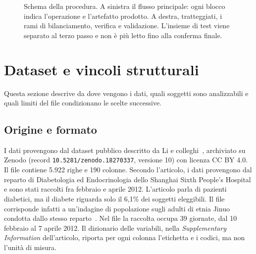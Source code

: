 \documentclass[a4paper, 12pt, oneside]{book}
\begin{document}
\begin{figure}[H]
	\caption{Schema della procedura. A sinistra il flusso principale: ogni blocco indica l'operazione e l'artefatto prodotto. A destra, tratteggiati, i rami di bilanciamento, verifica e validazione. L'insieme di test viene separato al terzo passo e non è più letto fino alla conferma finale.}
	\label{fig:pipeline}
\end{figure}

\section{Dataset e vincoli strutturali}

Questa sezione descrive da dove vengono i dati, quali soggetti sono analizzabili e quali limiti del file condizionano le scelte successive.

\subsection{Origine e formato}


I dati provengono dal dataset pubblico descritto da Li e colleghi~\cite{li_bimodal_2026}, archiviato su Zenodo (record \texttt{10.5281/zenodo.18270337}, versione 10) con licenza CC BY 4.0. Il file contiene 5.922 righe e 190 colonne. Secondo l'articolo, i dati provengono dal reparto di Diabetologia ed Endocrinologia dello Shanghai Sixth People's Hospital e sono stati raccolti fra febbraio e aprile 2012. L'articolo parla di pazienti diabetici, ma il diabete riguarda solo il 6,1\% dei soggetti eleggibili. Il file corrisponde infatti a un'indagine di popolazione sugli adulti di etnia Jinuo condotta dallo stesso reparto~\cite{jiang_jinuo_2016}. Nel file la raccolta occupa 39 giornate, dal 10 febbraio al 7 aprile 2012. Il dizionario delle variabili, nella \textit{Supplementary Information} dell'articolo, riporta per ogni colonna l'etichetta e i codici, ma non l'unità di misura.
\end{document}
